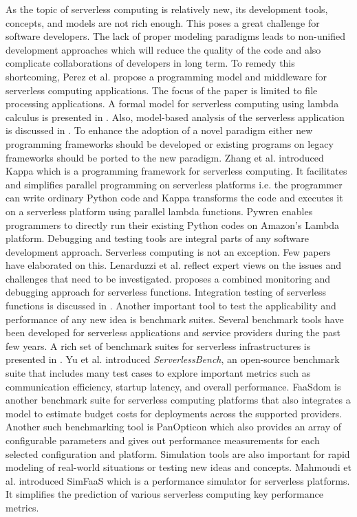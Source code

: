 As the topic of serverless computing is relatively new, its development tools, concepts, and models are not rich enough. This poses a great challenge for software developers. The lack of proper modeling paradigms leads to non-unified development approaches which will reduce the quality of the code and also complicate collaborations of developers in long term. To remedy this shortcoming, Perez et al.  propose a programming model and middleware for serverless computing applications. The focus of the paper is limited to file processing applications. A formal model for serverless computing using lambda calculus is presented in . Also, model-based analysis of the serverless application is discussed in . 
To enhance the adoption of a novel paradigm either new programming frameworks should be developed or existing programs on legacy frameworks should be ported to the new paradigm. Zhang et al.  introduced Kappa which is a programming framework for serverless computing. It facilitates and simplifies parallel programming on serverless platforms i.e. the programmer can write ordinary Python code and Kappa transforms the code and executes it on a serverless platform using parallel lambda functions. Pywren  enables programmers to directly run their existing Python codes on Amazon's Lambda platform.
Debugging and testing tools are integral parts of any software development approach. Serverless computing is not an exception. Few papers have elaborated on this. Lenarduzzi et al.  reflect expert views on the issues and challenges that need to be investigated.   proposes a combined monitoring and debugging approach for serverless functions. Integration testing of serverless functions is discussed in .
Another important tool to test the applicability and performance of any new idea is benchmark suites. Several benchmark tools have been developed for serverless applications and service providers during the past few years. A rich set of benchmark suites for serverless infrastructures is presented in . Yu et al.  introduced \textit{ServerlessBench}, an open-source benchmark suite that includes many test cases to explore important metrics such as communication efficiency, startup latency, and overall performance. FaaSdom  is another benchmark suite for serverless computing platforms that also integrates a model to estimate budget costs for deployments across the supported providers. Another such benchmarking tool is PanOpticon  which also provides an array of configurable parameters and gives out performance measurements for each selected configuration and platform.
Simulation tools are also important for rapid modeling of real-world situations or testing new ideas and concepts. Mahmoudi et al.  introduced SimFaaS which is a performance simulator for serverless platforms. It simplifies the prediction of various serverless computing key performance metrics.

